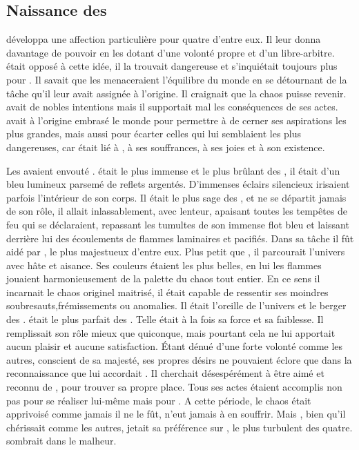 \subsection{Naissance des \Dormus}

\Mey développa une affection particulière pour quatre d'entre eux. Il leur donna davantage de pouvoir en les dotant d'une volonté propre et d'un libre-arbitre. \Cind était opposé à cette idée, il la trouvait dangereuse et s'inquiétait toujours plus pour \Mey. Il savait que les \Dormus menaceraient l'équilibre du monde en se détournant de la tâche qu'il leur avait assignée à l'origine. Il craignait que la chaos puisse revenir. \Mey avait de nobles intentions mais il supportait mal les conséquences de ses actes. \Cind avait à l'origine embrasé le monde pour permettre à \Mey de cerner ses aspirations les plus grandes, mais aussi pour écarter celles qui lui semblaient les plus dangereuses, car \Cind était lié à \Mey, à ses souffrances, à ses joies et à son existence.

Les \Dormus avaient envouté \Mey. \Boromu était le plus immense et le plus brûlant des \SerpentsCosmiques, il était d'un bleu lumineux parsemé de reflets argentés. D'immenses éclairs silencieux irisaient parfois l'intérieur de son corps. Il était le plus sage des \Dormus, et ne se départit jamais de son rôle, il allait inlassablement, avec lenteur, apaisant toutes les tempêtes de feu qui se déclaraient, repassant les tumultes de son immense flot bleu et laissant derrière lui des écoulements de flammes laminaires et pacifiés. Dans sa tâche il fût aidé par \Esu, le plus majestueux d'entre eux. Plus petit que \Boromu, il parcourait l'univers avec hâte et aisance. Ses couleurs étaient les plus belles, en lui les flammes jouaient harmonieusement de la palette du chaos tout entier. En ce sens il incarnait le chaos originel maitrisé, il était capable de ressentir ses moindres soubresauts,frémissements ou anomalies. Il était l'oreille de l'univers et le berger des \SerpentsCosmiques. \Esu était le plus parfait des \Dormus. Telle était à la fois sa force et sa faiblesse. Il remplissait son rôle mieux que quiconque, mais pourtant cela ne lui apportait aucun plaisir et aucune satisfaction. Étant dénué d'une forte volonté comme les autres, conscient de sa majesté, ses propres désirs ne pouvaient éclore que dans la reconnaissance que lui accordait \Mey. Il cherchait désespérément à être aimé et reconnu de \Mey, pour trouver sa propre place. Tous ses actes étaient accomplis non pas pour se réaliser lui-même mais pour \Mey. A cette période, le chaos était apprivoisé comme jamais il ne le fût, \Mey n'eut jamais à en souffrir. Mais \Mey, bien qu'il chérissait \Esu comme les autres, jetait sa préférence sur \Ogo, le plus turbulent des quatre. \Esu sombrait dans le malheur.

